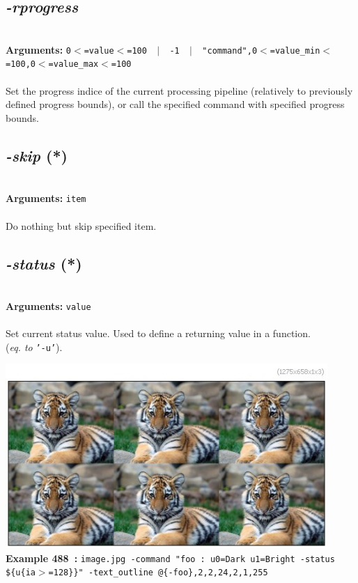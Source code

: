 \documentclass[a4paper,11pt,twoside]{book}
\begin{document}
\subsection{\emph{-rprogress} }\vspace*{-0.5em}
~\\\textbf{Arguments: } 
{\small \texttt{0$<$=value$<$=100 ~$|$~ -1 ~$|$~ "command",0$<$=value\_min$<$=100,0$<$=value\_max$<$=100}}\\~\\
Set the progress indice of the current processing pipeline (relatively to
previously defined progress bounds), or call the specified command with
specified progress bounds.


\subsection{\emph{-skip} (*)}\vspace*{-0.5em}
~\\\textbf{Arguments: } 
{\small \texttt{item}}\\~\\
Do nothing but skip specified item.


\subsection{\emph{-status} (*)}\vspace*{-0.5em}
~\\\textbf{Arguments: } 
{\small \texttt{value}}\\~\\
Set current status value. Used to define a returning value in a function.
~\\(\emph{eq. to} {\small \texttt{'-u'}}).
\begin{center}\includegraphics[keepaspectratio=true,height=7cm,width=\textwidth]{img/gmic_def488.jpg}\\
{\footnotesize \textbf{Example 488~:} \texttt{image.jpg -command "foo : u0=Dark u1=Bright -status \$\{u\{ia$>$=128\}\}" -text\_outline @\{-foo\},2,2,24,2,1,255}}
\end{center}
\end{document}
